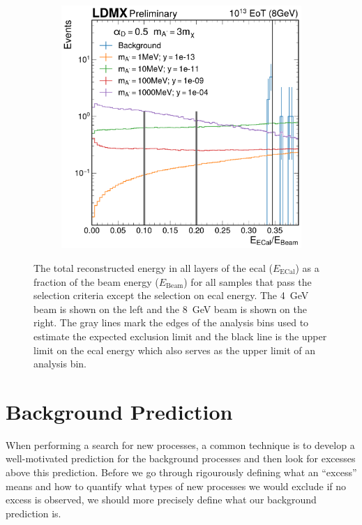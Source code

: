 \begin{figure}
\begin{subfigure}{0.48\textwidth}
       \includegraphics[width=\textwidth]{figures/ldmx/analysis/final-selection-with-ana-bin-edges-8gev.pdf}
    \end{subfigure}
    \centering
    \caption{The total reconstructed energy in all layers of the \ac{ecal} ($E_\text{ECal}$)
    as a fraction of the beam energy ($E_\text{Beam}$) for all samples that
    pass the selection criteria except the selection on \ac{ecal} energy.
    The \qty{4}{\GeV} beam is shown on the left and the \qty{8}{\GeV} beam is shown on the right.
    The gray lines mark the edges of the analysis bins used to
    estimate the expected exclusion limit and the black line is the upper limit
    on the \ac{ecal} energy which also serves as the upper limit of an analysis bin.
    }
    \label{fig:final-selection}
\end{figure}

\section{Background Prediction}
When performing a search for new processes, a common technique is to develop a well-motivated
prediction for the background processes and then look for excesses above this prediction.
Before we go through rigourously defining what an ``excess'' means and how to quantify
what types of new processes we would exclude if no excess is observed,
we should more precisely define what our background prediction is.

